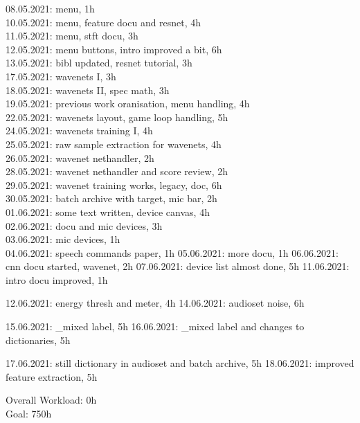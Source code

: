 08.05.2021: menu, 1h\\
10.05.2021: menu, feature docu and resnet, 4h\\
11.05.2021: menu, stft docu, 3h\\
12.05.2021: menu buttons, intro improved a bit, 6h\\

13.05.2021: bibl updated, resnet tutorial, 3h\\
17.05.2021: wavenets I, 3h\\

18.05.2021: wavenets II, spec math, 3h\\
19.05.2021: previous work oranisation, menu handling, 4h\\
22.05.2021: wavenets layout, game loop handling, 5h\\

24.05.2021: wavenets training I, 4h\\
25.05.2021: raw sample extraction for wavenets, 4h\\

26.05.2021: wavenet nethandler, 2h\\
28.05.2021: wavenet nethandler and score review, 2h\\
29.05.2021: wavenet training works, legacy, doc, 6h\\

30.05.2021: batch archive with target, mic bar, 2h\\
01.06.2021: some text written, device canvas, 4h\\
02.06.2021: docu and mic devices, 3h\\
03.06.2021: mic devices, 1h\\

04.06.2021: speech commands paper, 1h
05.06.2021: more docu, 1h
06.06.2021: cnn docu started, wavenet, 2h
07.06.2021: device list almost done, 5h
11.06.2021: intro docu improved, 1h

12.06.2021: energy thresh and meter, 4h
14.06.2021: audioset noise, 6h

15.06.2021: _mixed label, 5h
16.06.2021: _mixed label and changes to dictionaries, 5h

17.06.2021: still dictionary in audioset and batch archive, 5h
18.06.2021: improved feature extraction, 5h




\vspace{0.5cm}
\noindent
Overall Workload: 0h\\
Goal: 750h